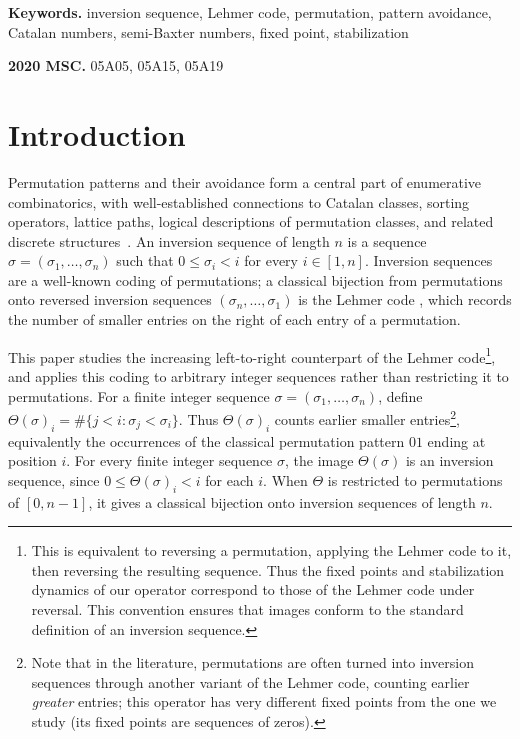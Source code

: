 \documentclass[11pt]{article}
\theoremstyle{remark}
\theoremstyle{definition}
\newcommand{\keywords}[1]{%
  \par\smallskip
  \noindent\textbf{Keywords. }#1
}
\newcommand{\subjclass}[2][]{%
  \par\smallskip
  \noindent\textbf{2020 MSC. }#2
}
\begin{document}
\keywords{
inversion sequence,
Lehmer code,
permutation,
pattern avoidance,
Catalan numbers,
semi-Baxter numbers,
fixed point,
stabilization
}

\subjclass[2020]{
05A05,
05A15,
05A19
}

\section{Introduction}

Permutation patterns and their avoidance form a central part of enumerative combinatorics, with well-established connections to Catalan classes, sorting operators, lattice paths, logical descriptions of permutation classes, and related discrete structures~\cite{Albert_Bouvel_Feray_2020,Kitaev_2011,Simion_Schmidt_1985,Vatter_2015}. An inversion sequence of length $n$ is a sequence $\sigma=(\sigma_1,\ldots,\sigma_n)$ such that $0\leq \sigma_i<i$ for every $i\in[1,n]$. Inversion sequences are a well-known coding of permutations; a classical bijection from permutations onto reversed inversion sequences $(\sigma_n,\ldots,\sigma_1)$ is the Lehmer code \cite{Lehmer_1960}, which records the number of smaller entries on the right of each entry of a permutation.

This paper studies the increasing left-to-right counterpart of the Lehmer code\footnote{This is equivalent to reversing a permutation, applying the Lehmer code to it, then reversing the resulting sequence. Thus the fixed points and stabilization dynamics of our operator correspond to those of the Lehmer code under reversal. This convention ensures that images conform to the standard definition of an inversion sequence.}, and applies this coding to arbitrary integer sequences rather than restricting it to permutations. For a finite integer sequence ${\sigma=(\sigma_1,\ldots,\sigma_n)}$, define $\Theta(\sigma)_i=\#\{j<i:\sigma_j<\sigma_i\}$. Thus $\Theta(\sigma)_i$ counts earlier smaller entries\footnote{Note that in the literature, permutations are often turned into inversion sequences through another variant of the Lehmer code, counting earlier \emph{greater} entries; this operator has very different fixed points from the one we study (its fixed points are sequences of zeros).}, equivalently the occurrences of the classical permutation pattern $01$ ending at position $i$. For every finite integer sequence $\sigma$, the image $\Theta(\sigma)$ is an inversion sequence, since $0\leq\Theta(\sigma)_i<i$ for each $i$. When $\Theta$ is restricted to permutations of $[0,n-1]$, it gives a classical bijection onto inversion sequences of length $n$.
\end{document}
